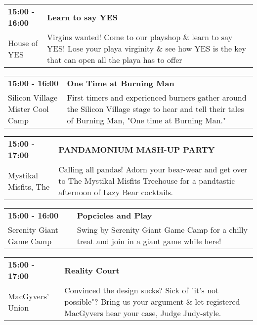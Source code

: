 \begin{tabular}{ p{1in} p{2.2in} }
    \textbf{15:00 - 16:00} & \textbf{Learn to say YES} \\
    House of YES \newline  & Virgins wanted!  Come to our playshop \& learn to say YES!  Lose your playa virginity \& see how YES is the key that can open all the playa has to offer \\
    \hline 
\end{tabular}
    
\begin{tabular}{ p{1in} p{2.2in} }
    \textbf{15:00 - 16:00} & \textbf{One Time at Burning Man} \\
    Silicon Village \newline Mister Cool Camp & First timers and experienced burners gather around the Silicon Village stage to hear and tell their tales of Burning Man, "One time at Burning Man." \\
    \hline 
\end{tabular}
    
\begin{tabular}{ p{1in} p{2.2in} }
    \textbf{15:00 - 17:00} & \textbf{PANDAMONIUM MASH-UP PARTY} \\
    Mystikal Misfits, The \newline  & Calling all pandas! Adorn your bear-wear and get over to The Mystikal Misfits Treehouse for a pandtastic afternoon of Lazy Bear cocktails. \\
    \hline 
\end{tabular}
    
\begin{tabular}{ p{1in} p{2.2in} }
    \textbf{15:00 - 16:00} & \textbf{Popcicles and Play} \\
    Serenity Giant Game Camp \newline  & Swing by Serenity Giant Game Camp for a chilly treat and join in a giant game while here! \\
    \hline 
\end{tabular}
    
\begin{tabular}{ p{1in} p{2.2in} }
    \textbf{15:00 - 17:00} & \textbf{Reality Court} \\
    MacGyvers' Union \newline  & Convinced the design sucks? Sick of "it's not possible"? Bring us your argument \& let registered MacGyvers hear your case, Judge Judy-style. \\
    \hline 
\end{tabular}
    
